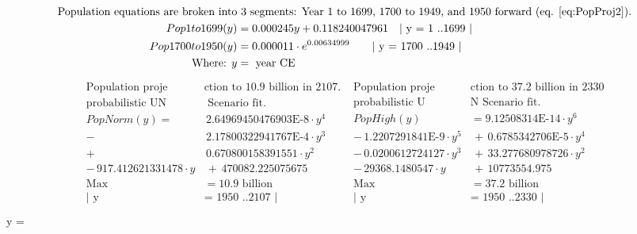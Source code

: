 \documentclass{article}
\begin{document}
\begin{align}
    \begin{split} 
\label{eq:PopProj1}
\text{Population equations are broken into} & \text{ 3 segments: Year 1 to 1699, 1700 to 1949, and 1950 forward (eq. \ref{eq:PopProj2}). }\\
 Pop1to1699(y) &=  0.000245y + 0.118240047961 \quad \text{| y = 1 ..1699 |} \\
 Pop1700to1950(y) &= 0.000011 \cdot e^{0.00634999} \qquad \text{| y = 1700 ..1949 |}\\
\text{Where: } y  &=  \text{ year CE}
\end{split}
\end{align}
\begin{align}
    \begin{split} 
\label{eq:PopProj2}
 \text{Population proje} & \text{ction to 10.9 billion in 2107.  } \\ \text{probabilistic UN} & \text{ Scenario fit.} \\
 PopNorm(y) =& \, 2.64969450476903\text{E-8} \cdot y^4 \\ 
- &\, 2.17800322941767\text{E-4} \cdot y^3 \\ 
+ &\, 0.670800158391551 \cdot y^2 \\
 - \, 917.412621331478 \cdot y &\,
  + \, 470082.225075675 \\ 
\text{Max} &= 10.9 \text{ billion} \\
 \text{| y }&= \text{ 1950 ..2107 |} \\
\end{split}
 \begin{split}
 \text{Population proje} & \text{ction to 37.2 billion in 2330 } \\ \text{probabilistic U} & \text{N Scenario fit.} \\
PopHigh(y) &=  9.12508314 \text{E-14} \cdot y^6  \\
- \, 1.2207291841 \text{E-9} \cdot y^5 &\,
+ \, 0.6785342706\text{E-5} \cdot y^4 \\ 
- \, 0.0200612724127 \cdot y^3 &\,
+ \, 33.277680978726 \cdot y^2 \\ 
- \, 29368.1480547 \cdot y  &\,
+ \, 10773554.975 \\
\text{Max} &= 37.2 \text{ billion} \\
 \text{| y }&= \text{ 1950 ..2330 |} \\
\end{split}
\end{align}
\qquad \qquad \qquad \qquad \qquad \qquad \qquad \qquad \qquad {} y  =    
\end{document}
